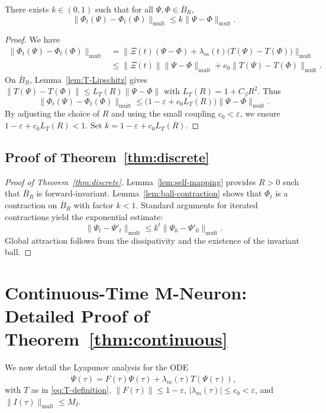 \documentclass[11pt]{article}
\begin{document}
\begin{lemma}
\label{lem:ball-contraction}
There exists \(k\in(0,1)\) such that for all \(\Psi,\Phi\in\overline{B}_R\),
\[
\|\Phi_t(\Psi) - \Phi_t(\Phi)\|_{\mathrm{mult}}
\le k \|\Psi - \Phi\|_{\mathrm{mult}}.
\]
\end{lemma}

\begin{proof}
We have
\[
\begin{aligned}
\|\Phi_t(\Psi) - \Phi_t(\Phi)\|_{\mathrm{mult}}
&= \|\Xi(t)(\Psi - \Phi) + \lambda_m(t)\bigl(T(\Psi) - T(\Phi)\bigr)\|_{\mathrm{mult}} \\
&\le \|\Xi(t)\|\|\Psi - \Phi\|_{\mathrm{mult}}
+ c_0 \|T(\Psi) - T(\Phi)\|_{\mathrm{mult}}.
\end{aligned}
\]
On \(\overline{B}_R\), Lemma~\ref{lem:T-Lipschitz} gives \(\|T(\Psi) - T(\Phi)\|\le L_T(R)\|\Psi - \Phi\|\) with \(L_T(R) = 1+C_\beta R^2\).
Thus
\[
\|\Phi_t(\Psi) - \Phi_t(\Phi)\|_{\mathrm{mult}}
\le \bigl(1-\varepsilon + c_0 L_T(R)\bigr)\|\Psi - \Phi\|_{\mathrm{mult}}.
\]
By adjusting the choice of \(R\) and using the small coupling \(c_0<\varepsilon\), we ensure \(1-\varepsilon + c_0 L_T(R) < 1\). Set \(k = 1-\varepsilon + c_0 L_T(R)\).
\end{proof}

\subsection{Proof of Theorem~\ref{thm:discrete}}

\begin{proof}[Proof of Theorem~\ref{thm:discrete}]
Lemma~\ref{lem:self-mapping} provides \(R>0\) such that \(\overline{B}_R\) is forward-invariant.
Lemma~\ref{lem:ball-contraction} shows that \(\Phi_t\) is a contraction on \(\overline{B}_R\) with factor \(k<1\).
Standard arguments for iterated contractions yield the exponential estimate:
\[
\|\Psi_t - \Psi'_t\|_{\mathrm{mult}}
\le k^t \|\Psi_0 - \Psi'_0\|_{\mathrm{mult}}.
\]
Global attraction follows from the dissipativity and the existence of the invariant ball.
\end{proof}

\section{Continuous-Time M-Neuron: Detailed Proof of Theorem~\ref{thm:continuous}}

We now detail the Lyapunov analysis for the ODE
\[
\dot{\Psi}(\tau) = F(\tau)\Psi(\tau) + \lambda_m(\tau) T(\Psi(\tau)),
\]
with \(T\) as in \eqref{eq:T-definition}, \(\|F(\tau)\|\le 1-\varepsilon\), \(|\lambda_m(\tau)|\le c_0<\varepsilon\), and \(\|I(\tau)\|_{\mathrm{mult}}\le M_I\).
\end{document}
